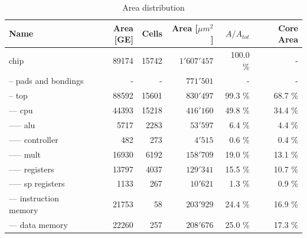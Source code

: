 \begin{table}[htbp]
 \caption{Area distribution}
 \label{tab:area_dist}
 \centering\begin{tabular}{|l|r|r|r|r|r|} \hline
Name & Area [GE] & Cells & Area [$\mu m^2$] & $A/A_{tot}$ & Core Area \\ \hline
chip & 89174 & 15742 	& $1'607'457$ & 100.0 \% & - \\ \hline
-- pads and bondings 	& - &-&$771'501$ & - & - \\ \hline
-- top & 88592 & 15601 	& $830'497$ & 99.3 \% & 68.7 \%  \\ \hline
--- cpu & 44393 & 15218 & $416'160$ & 49.8 \% & 34.4 \%  \\ \hline
----- alu   & 5717 & 2283  	& $53'597$ & 6.4 \% & 4.4 \%\\ \hline
----- controller  & 482 & 273  	& $4'515$ & 0.6 \% & 0.4  \%\\ \hline
----- mult & 16930 & 6192 	& $158'709$ & 19.0 \% & 13.1 \% \\ \hline
----- registers& 13797 & 4037  	& $129'341$ & 15.5 \% & 10.7 \% \\ \hline
----- sp registers & 1133 & 267 & $10'621$ & 1.3 \% & 0.9 \% \\ \hline
--- instruction memory&21753& 58& $203'929$ & 24.4 \% & 16.9 \% \\ \hline
--- data memory  & 22260  & 257 & $208'676$ & 25.0 \% & 17.3 \% \\ \hline
 \end{tabular}
\end{table}
\newpage
